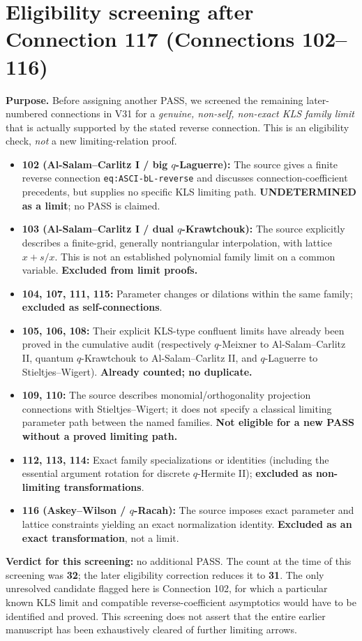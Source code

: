 \documentclass[11pt]{article}
\begin{document}
\section{Eligibility screening after Connection 117 (Connections 102--116)}
\noindent\textbf{Purpose.} Before assigning another PASS, we screened the remaining later-numbered connections in V31 for a \emph{genuine, non-self, non-exact KLS family limit} that is actually supported by the stated reverse connection. This is an eligibility check, \emph{not} a new limiting-relation proof.

\begin{itemize}
\item \textbf{102 (Al-Salam--Carlitz I / big $q$-Laguerre):} The source gives a finite reverse connection \texttt{eq:ASCI-bL-reverse} and discusses connection-coefficient precedents, but supplies no specific KLS limiting path. \textbf{UNDETERMINED as a limit}; no PASS is claimed.
\item \textbf{103 (Al-Salam--Carlitz I / dual $q$-Krawtchouk):} The source explicitly describes a finite-grid, generally nontriangular interpolation, with lattice $x+s/x$. This is not an established polynomial family limit on a common variable. \textbf{Excluded from limit proofs.}
\item \textbf{104, 107, 111, 115:} Parameter changes or dilations within the same family; \textbf{excluded as self-connections}.
\item \textbf{105, 106, 108:} Their explicit KLS-type confluent limits have already been proved in the cumulative audit (respectively $q$-Meixner to Al-Salam--Carlitz II, quantum $q$-Krawtchouk to Al-Salam--Carlitz II, and $q$-Laguerre to Stieltjes--Wigert). \textbf{Already counted; no duplicate.}
\item \textbf{109, 110:} The source describes monomial/orthogonality projection connections with Stieltjes--Wigert; it does not specify a classical limiting parameter path between the named families. \textbf{Not eligible for a new PASS without a proved limiting path.}
\item \textbf{112, 113, 114:} Exact family specializations or identities (including the essential argument rotation for discrete $q$-Hermite II); \textbf{excluded as non-limiting transformations}.
\item \textbf{116 (Askey--Wilson / $q$-Racah):} The source imposes exact parameter and lattice constraints yielding an exact normalization identity. \textbf{Excluded as an exact transformation}, not a limit.
\end{itemize}
\noindent\textbf{Verdict for this screening:} no additional PASS. The count at the time of this screening was \textbf{32}; the later eligibility correction reduces it to \textbf{31}. The only unresolved candidate flagged here is Connection 102, for which a particular known KLS limit and compatible reverse-coefficient asymptotics would have to be identified and proved. This screening does not assert that the entire earlier manuscript has been exhaustively cleared of further limiting arrows.
\end{document}
